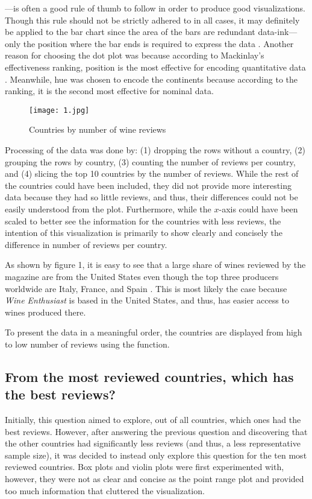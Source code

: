\noindent ---is often a good rule of thumb to follow in order to produce good visualizations. Though this rule should not be strictly adhered to in all cases, it may definitely be applied to the bar chart since the area of the bars are redundant data-ink---only the position where the bar ends is required to express the data \cite{Tufte}. Another reason for choosing the dot plot was because according to Mackinlay's effectiveness ranking, position is the most effective for encoding quantitative data \cite{Mackinlay}. Meanwhile, hue was chosen to encode the continents because according to the ranking, it is the second most effective for nominal data.

\begin{figure}[h]
  \texttt{[image: 1.jpg]}  
  \caption{Countries by number of wine reviews}
\end{figure}

Processing of the data was done by: (1) dropping the rows without a country, (2) grouping the rows by country, (3) counting the number of reviews per country, and (4) slicing the top 10 countries by the number of reviews. While the rest of the countries could have been included, they did not provide more interesting data because they had so little reviews, and thus, their differences could not be easily understood from the plot. Furthermore, while the $x$-axis could have been scaled to better see the information for the countries with less reviews, the intention of this visualization is primarily to show clearly and concisely the difference in number of reviews per country.

As shown by figure 1, it is easy to see that a large share of wines reviewed by the magazine are from the United States even though the top three producers worldwide are Italy, France, and Spain \cite{Statista}. This is most likely the case because \emph{Wine Enthusiast} is based in the United States, and thus, has easier access to wines produced there.



To present the data in a meaningful order, the countries are displayed from high to low number of reviews using the  function.

\subsection{From the most reviewed countries, which has the best reviews?}
Initially, this question aimed to explore, out of all countries, which ones had the best reviews. However, after answering the previous question and discovering that the other countries had significantly less reviews (and thus, a less representative sample size), it was decided to instead only explore this question for the ten most reviewed countries. Box plots and violin plots were first experimented with, however, they were not as clear and concise as the point range plot and provided too much information that cluttered the visualization.

